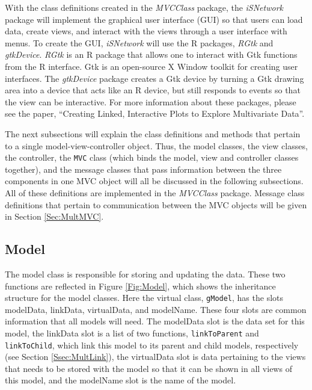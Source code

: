 \documentclass{article}[11pt]
\newcommand{\Rfunction}[1]{{\texttt{#1}}}
\newcommand{\Robject}[1]{{\texttt{#1}}}
\newcommand{\Rpackage}[1]{{\textit{#1}}}
\begin{document}
With the class definitions created in the \Rpackage{MVCClass} package, the
\Rpackage{iSNetwork} package will implement the graphical user interface
(GUI) so that users can load data, create views, and interact with the views
through a user interface with menus.  To create the GUI, \Rpackage{iSNetwork}
will use the R packages, \Rpackage{RGtk} and \Rpackage{gtkDevice}.
\Rpackage{RGtk} is an R package that allows one to interact with Gtk functions
from the R interface.  Gtk is an open-source X Window toolkit for creating
user interfaces.  The \Rpackage{gtkDevice} package creates a Gtk device by
turning a Gtk drawing area into a device that acts like an R device, but still
responds to events so that the view can be interactive.  For more information
about these packages, please see the paper, ``Creating Linked, Interactive
Plots to Explore Multivariate Data''. 

The next subsections will explain the class definitions and methods that
pertain to a single model-view-controller object.  Thus, the model classes,
the view classes, the controller, the \Robject{MVC} class (which binds the
model, view and controller classes together), and the message classes that pass
information between the three components in one MVC object will all be
discussed in the following subsections.  All of these definitions are
implemented in the \Rpackage{MVCClass} package.  Message class definitions
that pertain to communication between the MVC objects will be given in
Section \ref{Sec:MultMVC}.

\subsection{Model}\label{Ssec:OneModel}

The model class is responsible for storing and updating the data.  These two
functions are reflected in Figure \ref{Fig:Model}, which shows the inheritance
structure for the model classes.  Here the virtual class,
\Robject{gModel}, has the slots modelData, linkData, virtualData, and
modelName.  These four slots are common information that all models will
need.  The modelData slot is the data set for this model, the linkData slot is
a list of two functions, \Rfunction{linkToParent} and \Rfunction{linkToChild},
which link this model to its parent and child models, respectively (see Section
\ref{Ssec:MultLink}), the virtualData slot is data pertaining to the views
that needs to be stored with the model so that it can be shown in all views of
this model, and the modelName slot is the name of the model. 
\end{document}
